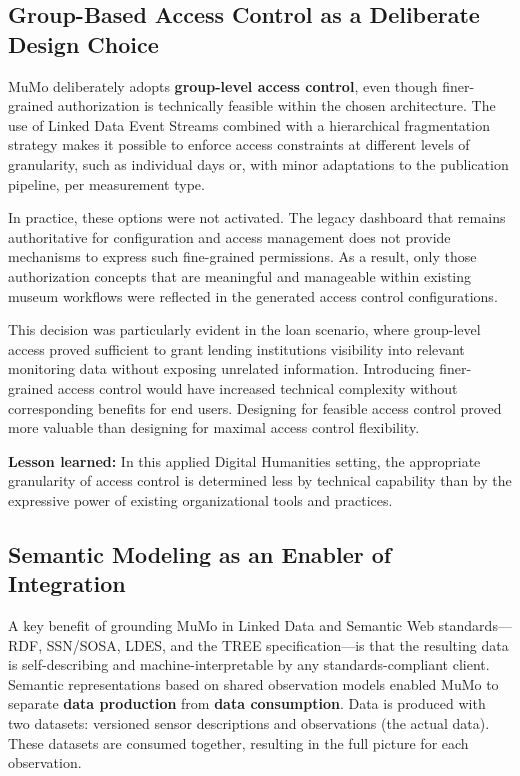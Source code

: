 \subsection{Group-Based Access Control as a Deliberate Design
Choice}\label{group-based-access-control-as-a-deliberate-design-choice}

MuMo deliberately adopts \textbf{group-level access control}, even
though finer-grained authorization is technically feasible within the
chosen architecture. The use of Linked Data Event Streams combined with
a hierarchical fragmentation strategy makes it possible to enforce
access constraints at different levels of granularity, such as
individual days or, with minor adaptations to the publication pipeline,
per measurement type.

In practice, these options were not activated. The legacy dashboard that
remains authoritative for configuration and access management does not
provide mechanisms to express such fine-grained permissions. As a
result, only those authorization concepts that are meaningful and
manageable within existing museum workflows were reflected in the
generated access control configurations.

This decision was particularly evident in the loan scenario, where
group-level access proved sufficient to grant lending institutions
visibility into relevant monitoring data without exposing unrelated
information. Introducing finer-grained access control would have
increased technical complexity without corresponding benefits for end
users. Designing for feasible access control proved more valuable than
designing for maximal access control flexibility.

\textbf{Lesson learned:} In this applied Digital Humanities setting, the
appropriate granularity of access control is determined less by
technical capability than by the expressive power of existing
organizational tools and practices.

\subsection{Semantic Modeling as an Enabler of
Integration}\label{semantic-modeling-as-an-enabler-of-integration}

A key benefit of grounding MuMo in Linked Data and Semantic Web
standards---RDF, SSN/SOSA, LDES, and the TREE specification---is that
the resulting data is self-describing and machine-interpretable by any
standards-compliant client. Semantic representations based on shared
observation models enabled MuMo to separate \textbf{data production}
from \textbf{data consumption}. Data is produced with two datasets:
versioned sensor descriptions and observations (the actual data). These
datasets are consumed together, resulting in the full picture for each
observation.

